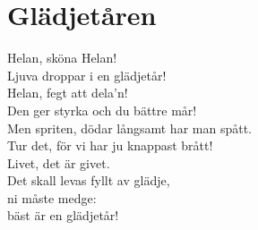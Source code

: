 \section{Glädjetåren}
Helan, sköna Helan!\\
Ljuva droppar i en glädjetår!\\

Helan, fegt att dela'n!\\
Den ger styrka och du bättre mår!\\

Men spriten, dödar långsamt har man spått.\\
Tur det, för vi har ju knappast brått!\\

Livet, det är givet.\\
Det skall levas fyllt av glädje,\\
ni måste medge:\\
bäst är en glädjetår!\\